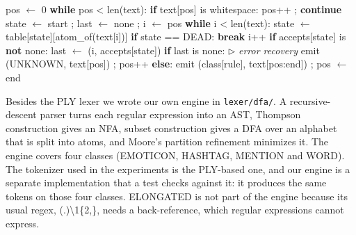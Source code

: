 \documentclass[journal,a4paper]{IEEEtran}
\begin{document}
\begin{algorithm}[!tb]
\scriptsize
\caption{Longest-match scanner with error recovery}\label{alg:3}
\begin{algorithmic}[1]
\State \hspace*{1.0em}pos $\leftarrow$ 0
\State \hspace*{1.0em}\textbf{while} pos \textless{} len(text):
\State \hspace*{2.0em}\textbf{if} text[pos] is whitespace: pos++ ; \textbf{continue}
\State \hspace*{2.0em}state $\leftarrow$ start ; last $\leftarrow$ none ; i $\leftarrow$ pos
\State \hspace*{2.0em}\textbf{while} i \textless{} len(text):
\State \hspace*{3.0em}state $\leftarrow$ table[state][atom\_of(text[i])]
\State \hspace*{3.0em}\textbf{if} state == DEAD: \textbf{break}
\State \hspace*{3.0em}i++
\State \hspace*{3.0em}\textbf{if} accepts[state] is \textbf{not} none:
\State \hspace*{4.0em}last $\leftarrow$ (i, accepts[state])
\State \hspace*{2.0em}\textbf{if} last is none: \hfill{\scriptsize$\triangleright$ \textit{error recovery}}
\State \hspace*{3.0em}emit (UNKNOWN, text[pos]) ; pos++
\State \hspace*{2.0em}\textbf{else}:
\State \hspace*{3.0em}emit (class[rule], text[pos:end]) ; pos $\leftarrow$ end
\end{algorithmic}
\end{algorithm}

Besides the PLY lexer we wrote our own engine in \texttt{lexer/\allowbreak{}dfa/\allowbreak{}}. A recursive-descent parser turns each regular expression into an AST, Thompson construction \cite{r5} gives an NFA, subset construction \cite{r6} gives a DFA over an alphabet that is split into atoms, and Moore's partition refinement \cite{r7} minimizes it. The engine covers four classes (EMOTICON, HASHTAG, MENTION and WORD). The tokenizer used in the experiments is the PLY-based one, and our engine is a separate implementation that a test checks against it: it produces the same tokens on those four classes. ELONGATED is not part of the engine because its usual regex, (.)\textbackslash{}1\{2,\}, needs a back-reference, which regular expressions cannot express.
\end{document}
